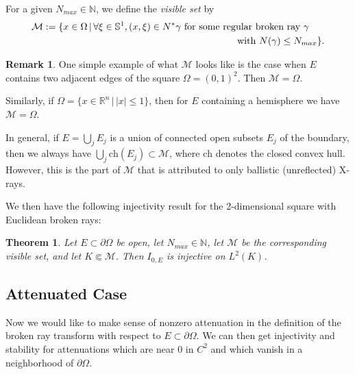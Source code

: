 \documentclass[10pt]{amsart}
\newtheorem{theorem}{Theorem}
\theoremstyle{definition}
\theoremstyle{definition}
\newtheorem{remark*}{Remark}
\theoremstyle{definition}
\newcommand{ \rn }[1]{\mathbb{R}^{#1}}
\begin{document}
For a given $N_{max} \in \mathbb{N}$, we define the \textit{visible set} by
\begin{align}
\mathcal{M} & := \{x \in \Omega \, | \, \forall \xi \in \mathbb{S}^{1}, (x,\xi) \in N^{*}\gamma \textrm{ for some regular broken ray $\gamma$}\\
& \hspace{7cm} \textrm{ with $N(\gamma) \leq N_{max}$}\}. \notag
\end{align}
\begin{remark*}
One simple example of what $\mathcal{M}$ looks like is the case when $E$ contains two adjacent edges of the square $\Omega = (0,1)^2$. Then $\mathcal{M} = \Omega$.

Similarly, if $\Omega = \{x \in \rn{n} \, | \, |x| \leq 1 \}$, then for $E$ containing a hemisphere we have $\mathcal{M} = \Omega$.

In general, if $E = \bigcup_{j}E_{j}$ is a union of connected open subsets $E_{j}$ of the boundary, then we always have $\bigcup_{j} \mathrm{ch}(E_{j})\subset \mathcal{M}$, where $\mathrm{ch}$ denotes the closed convex hull. However, this is the part of $\mathcal{M}$ that is attributed to only ballistic (unreflected) X-rays.
\end{remark*}

We then have the following injectivity result for the 2-dimensional square with Euclidean broken rays:
\begin{theorem}Let $E \subset \partial \Omega$ be open, let $N_{max} \in \mathbb{N}$, let $\mathcal{M}$ be the corresponding visible set,
and let $K \Subset \mathcal{M}$. Then $I_{0, E}$ is injective on $L^{2}(K)$. \label{thm:injectivesquare}\end{theorem}


\subsection{Attenuated Case}
Now we would like to make sense of nonzero attenuation in the definition of the broken ray transform with respect to $E \subset \partial \Omega$. We can then get injectivity and stability for attenuations which are near $0$ in $C^{2}$ and which vanish in a neighborhood of $\partial \Omega$.
\end{document}
